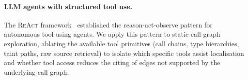 \paragraph{LLM agents with structured tool use.}
The \textsc{ReAct} framework~\cite{yao23react} established the
reason-act-observe pattern for autonomous tool-using agents.
We apply this pattern to static call-graph exploration, ablating the available
tool primitives (call chains, type hierarchies, taint paths, raw source retrieval)
to isolate which specific tools assist localisation and whether tool access reduces
the citing of edges not supported by the underlying call graph.
